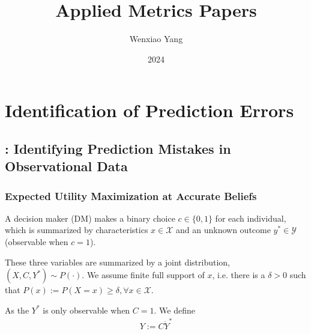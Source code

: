 \documentclass[11pt]{elegantbook}
\title{Applied Metrics Papers}
\author{Wenxiao Yang}
\institute{Haas School of Business, University of California Berkeley}
\date{2024}
\begin{document}
\maketitle

\frontmatter
\tableofcontents

\mainmatter

\chapter{Identification of Prediction Errors}
\section{\cite{rambachan2024identifying}: Identifying Prediction Mistakes in Observational Data}


\subsection{Expected Utility Maximization at Accurate Beliefs}
A decision maker (DM) makes a binary choice $c\in\{0,1\}$ for each individual, which is summarized by characteristics $x\in \mathcal{X}$ and an unknown outcome $y^*\in \mathcal{Y}$ (observable when $c=1$).

These three variables are summarized by a joint distribution, $(X,C,Y^*)\sim P(\cdot)$. We assume finite full support of $x$, i.e. there is a $\delta>0$ such that $P(x):=P(X=x)\geq \delta,\forall x\in \mathcal{X}$.

As the $Y^*$ is only observable when $C=1$. We define
\begin{equation}
    \begin{aligned}
        Y:=C\dot Y^*
    \end{aligned}
    \nonumber
\end{equation}













\appendix











\end{document}
